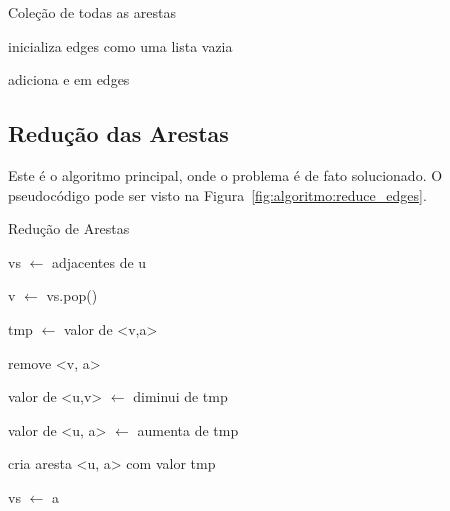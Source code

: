 \documentclass[12pt]{article}
\begin{document}
\begin{algorithm}[H]
  \caption{Coleção de todas as arestas}
  \label{alg:all_edges}
  inicializa edges como uma lista vazia

  {
    {
      adiciona e em edges
    }
  }

\end{algorithm}

\subsection{Redução das Arestas}\label{sec:algoritmo:reduce}

Este é o algoritmo principal, onde o problema é de fato solucionado. O
pseudocódigo pode ser visto na Figura~\ref{fig:algoritmo:reduce_edges}.

\begin{algorithm}[H]
  \caption{Redução de Arestas}
  \label{alg:reduce_edges}
  {
    vs $\gets$ adjacentes de u

    {
      v $\gets$ vs.pop() 
      {
        {
          tmp $\gets$ valor de <v,a>

          remove <v, a>

          valor de <u,v> $\gets$ diminui de tmp

          {
            valor de <u, a> $\gets$ aumenta de tmp
          }
          \Senao
          {
            cria aresta <u, a> com valor tmp

            vs $\gets$ a 
          }
        }
      }
    }
  }
\end{algorithm}
\end{document}
